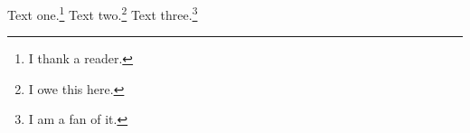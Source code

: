 \documentclass{scrartcl}
\begin{document}
Text one.\footnote{I thank a reader.}
Text two.\footnote[20]{I owe this here.}
Text three.\footnote[1000]{I am a fan of it.}
\end{document}
